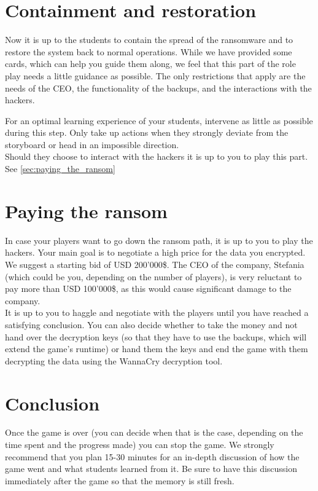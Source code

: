 \section{Containment and restoration}

Now it is up to the students to contain the spread of the ransomware and to restore the system back to normal operations.
While we have provided some cards, which can help you guide them along, we feel that this part of the role play needs a little guidance as possible.
The only restrictions that apply are the needs of the CEO, the functionality of the backups, and the interactions with the hackers.
\\


\begin{hint}    For an optimal learning experience of your students, intervene as little as possible during this step.
    Only take up actions when they strongly deviate from the storyboard or head in an impossible direction.
    \\

    Should they choose to interact with the hackers it is up to you to play this part.
    See \autoref{sec:paying_the_ransom}
\end{hint}

\section{Paying the ransom}
\label{sec:paying_the_ransom}

In case your players want to go down the ransom path, it is up to you to play the hackers.
Your main goal is to negotiate a high price for the data you encrypted.
We suggest a starting bid of USD 200'000\$.
The CEO of the company, Stefania (which could be you, depending on the number of players), is very reluctant to pay more than USD 100'000\$, as this would cause significant damage to the company.
\\

It is up to you to haggle and negotiate with the players until you have reached a satisfying conclusion.
You can also decide whether to take the money and not hand over the decryption keys (so that they have to use the backups, which will extend the game's runtime) or hand them the keys and end the game with them decrypting the data using the WannaCry decryption tool.

\section{Conclusion}

Once the game is over (you can decide when that is the case, depending on the time spent and the progress made) you can stop the game.
We strongly recommend that you plan 15-30 minutes for an in-depth discussion of how the game went and what students learned from it.
Be sure to have this discussion immediately after the game so that the memory is still fresh.